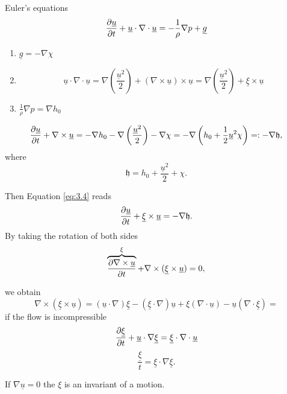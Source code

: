 \documentclass[11pt,oneside]{book}
\renewcommand{\vec}[1]{\underline{#1}}
\theoremstyle{definition} %
\theoremstyle{plain} %
\theoremstyle{remark} %
\theoremstyle{underline}
\begin{document}
  Euler's equations
  \begin{displaymath}
    \ptf{\vec u}{t}+ \vec u \cdot \nabla \cdot \vec u= - \frac{1}{\rho} \nabla p + \vec g
  \end{displaymath}
  \begin{enumerate}
    \item $ \vec g = - \nabla \chi$
    \item 
      \begin{displaymath}
        \vec u \cdot \nabla \cdot \vec u = \nabla \left( \frac{\vec u^2}{2} \right) + (\nabla \times \vec u) \times \vec u 
        = \nabla \left( \frac{\vec u^2}{2} \right) + \vec \xi \times \vec u
      \end{displaymath}
    \item $ \frac{1}{\rho} \nabla p = \nabla h_0$
  \end{enumerate}
  \begin{equation}
    \ptf{\vec u}{t} + \nabla \times \vec u = - \nabla h_0 - \nabla \left( \frac{\vec u^2}{2} \right) - \nabla \chi
    = - \nabla \left( h_0 + \frac{1}{2} \vec u^2 \chi \right) =: - \nabla  \mathfrak{h},
    \label{eq:3.4}
  \end{equation}
  where
  \begin{displaymath}
    \mathfrak{h} = h_0 + \frac{ \vec u^2}{2} + \chi .
  \end{displaymath}

  Then Equation \ref{eq:3.4} reads
  \begin{displaymath}
    \ptf{\vec u}{t} + \vec \xi \times \vec u = - \nabla \mf{h}.
  \end{displaymath}
  By taking the rotation of both sides 
  \begin{displaymath}
    \overbrace{\ptf{\nabla \times \vec u}{t}}^{\xi} + \nabla \times (\vec \xi \times \vec u) = 0,
  \end{displaymath}

  we obtain
  \begin{displaymath}
    \nabla \times (\vec \xi \times \vec u) = ( \vec u \cdot \nabla) \vec \xi - (\vec \xi \cdot \nabla) \vec u 
    + \xi (\nabla \cdot \vec u) - \vec u (\nabla \cdot \vec \xi)=
  \end{displaymath}
  if the flow is incompressible
  \begin{displaymath}
    \ptf{\vec \xi}{t} + \vec u \cdot \nabla \vec \xi = \vec \xi \cdot \nabla \cdot \vec u
  \end{displaymath}
  \begin{displaymath}
    \dfrac{\vec \xi}{t} = \vec \xi \cdot \nabla \vec \xi.
  \end{displaymath}

  If $\nabla \vec u = 0$ the $\xi $ is an invariant of a motion.
  
  

  
  
  
  
  
  
  
\end{document}
